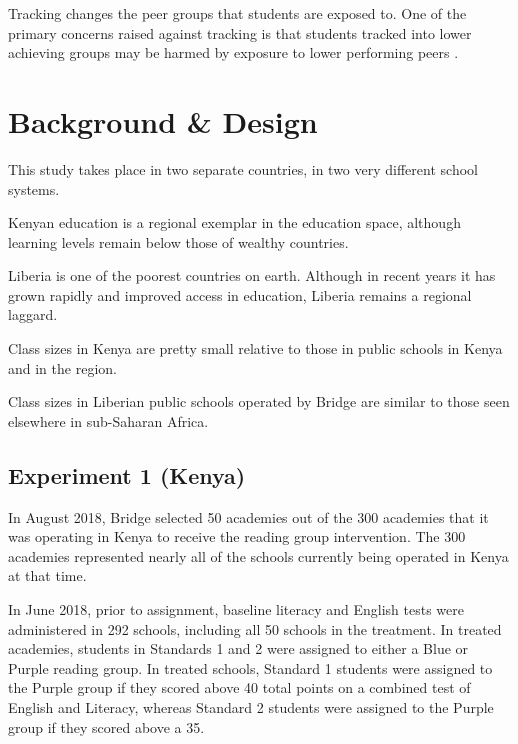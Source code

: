 \documentclass[11pt]{article}
\begin{document}
Tracking changes the peer groups that students are exposed to. One of the primary concerns raised against tracking is that students tracked into lower achieving groups may be harmed by exposure to lower performing peers \citep{betts:2011}. 


\section{Background \& Design}

This study takes place in two separate countries, in two very different school systems.

Kenyan education is a regional exemplar in the education space, although learning levels remain below those of wealthy countries. 

Liberia is one of the poorest countries on earth. Although in recent years it has grown rapidly and improved access in education, Liberia remains a regional laggard. 

Class sizes in Kenya are pretty small relative to those in public schools in Kenya and in the region.

Class sizes in Liberian public schools operated by Bridge are similar to those seen elsewhere in sub-Saharan Africa.

\subsection{Experiment 1 (Kenya)}

In August 2018, Bridge selected 50 academies out of the 300 academies that it was operating in Kenya to receive the reading group intervention.  The 300 academies represented nearly all of the schools currently being operated in Kenya at that time. 

In June 2018, prior to assignment, baseline literacy and English tests were administered in 292 schools, including all 50 schools in the treatment. In treated academies, students in Standards 1 and 2 were assigned to either a Blue or Purple reading group. In treated schools, Standard 1 students were assigned to the Purple group if they scored above 40 total points on a combined test of English and Literacy, whereas Standard 2 students were assigned to the Purple group if they scored above a 35. %
\end{document}

